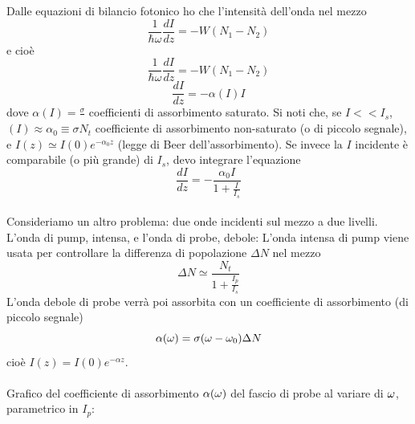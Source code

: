 Dalle equazioni di bilancio fotonico ho che l'intensità dell'onda nel mezzo 
\begin{equation*}
\frac{1}{\hbar\omega} \frac{dI}{dz} = -W(N_1 - N_2)
\end{equation*}
e cioè
\begin{equation*}
\frac{1}{\hbar\omega} \frac{dI}{dz} = -W(N_1 - N_2)
\end{equation*}
\begin{equation*}
\frac{dI}{dz} = - \alpha(I) I
\end{equation*}
dove $\alpha(I) = \frac{\sigma }{}$ coefficienti di assorbimento saturato.
Si noti che, se $I << I_s$, $(I) \approx \alpha_0 \equiv \sigma N_t$ coefficiente di assorbimento non-saturato (o di piccolo segnale), e $I(z) \simeq I(0) e^{-\alpha_0z}$ (legge di Beer dell'assorbimento). Se invece la $I$ incidente è comparabile (o più grande) di $I_s$, devo integrare l'equazione
\begin{equation*}
\frac{dI}{dz} = -\frac{\alpha_0 I}{1 + \frac{I}{I_s}}
\end{equation*}
\\
Consideriamo un altro problema: due onde incidenti sul mezzo a due livelli. L'onda di pump, intensa, e l'onda di probe, debole:
L'onda intensa di pump viene usata per controllare la differenza di popolazione $\Delta N$ nel mezzo
\begin{equation*}
\Delta N \simeq \frac{N_t}{1 + \frac{I_p}{I_s}}
\end{equation*}
L'onda debole di probe verrà poi assorbita con un coefficiente di assorbimento (di piccolo segnale)
\begin{equation*}
\alpha(\omega) = \sigma(\omega -\omega_0) \Delta N
\end{equation*}
cioè $I(z) = I(0) e^{-\alpha z}$.\\
\\
Grafico del coefficiente di assorbimento $\alpha(\omega)$ del fascio di probe al variare di $\omega$, parametrico in $I_p$:

